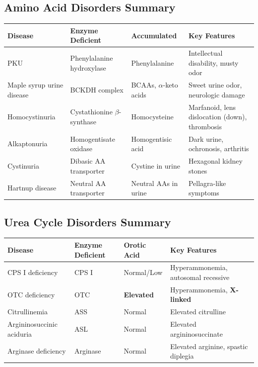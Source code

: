 \subsection{Amino Acid Disorders Summary}

\begin{center}
\begin{tabular}{p{3cm}p{3cm}p{4cm}p{4cm}}
\toprule
\textbf{Disease} & \textbf{Enzyme Deficient} & \textbf{Accumulated} & \textbf{Key Features} \\
\midrule
PKU & Phenylalanine hydroxylase & Phenylalanine & Intellectual disability, musty odor \\
Maple syrup urine disease & BCKDH complex & BCAAs, $\alpha$-keto acids & Sweet urine odor, neurologic damage \\
Homocystinuria & Cystathionine $\beta$-synthase & Homocysteine & Marfanoid, lens dislocation (down), thrombosis \\
Alkaptonuria & Homogentisate oxidase & Homogentisic acid & Dark urine, ochronosis, arthritis \\
Cystinuria & Dibasic AA transporter & Cystine in urine & Hexagonal kidney stones \\
Hartnup disease & Neutral AA transporter & Neutral AAs in urine & Pellagra-like symptoms \\
\bottomrule
\end{tabular}
\end{center}

\subsection{Urea Cycle Disorders Summary}

\begin{center}
\begin{tabular}{p{3.5cm}p{3cm}p{3cm}p{4cm}}
\toprule
\textbf{Disease} & \textbf{Enzyme Deficient} & \textbf{Orotic Acid} & \textbf{Key Features} \\
\midrule
CPS I deficiency & CPS I & Normal/Low & Hyperammonemia, autosomal recessive \\
OTC deficiency & OTC & \textbf{Elevated} & Hyperammonemia, \textbf{X-linked} \\
Citrullinemia & ASS & Normal & Elevated citrulline \\
Argininosuccinic aciduria & ASL & Normal & Elevated argininosuccinate \\
Arginase deficiency & Arginase & Normal & Elevated arginine, spastic diplegia \\
\bottomrule
\end{tabular}
\end{center}

